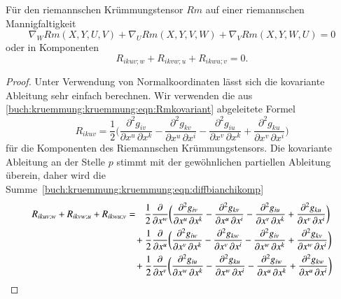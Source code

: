 \begin{satz}
Für den riemannschen Krümmungstensor $Rm$ auf einer riemannschen
Mannigfaltigkeit
\[
\nabla_W Rm(X,Y,U,V)
+
\nabla_U Rm(X,Y,V,W)
+
\nabla_V Rm(X,Y,W,U)
=
0
\]
oder in Komponenten
\begin{equation}
R_{ikuv;w}
+
R_{ikvw;u}
+
R_{ikwu;v}
=
0.
\label{buch:kruemmung:kruemmung:eqn:diffbianchikomp}
\end{equation}
\end{satz}

\begin{proof}
Unter Verwendung von Normalkoordinaten lässt sich die kovariante
Ableitung sehr einfach berechnen.
Wir verwenden die aus 
\ref{buch:kruemmung:kruemmung:eqn:Rmkovariant}
abgeleitete Formel
\[
R_{ikuv}
=
\frac12
\biggl(
\frac{\partial^2 g_{iv}}{\partial x^u\,\partial x^k}
-
\frac{\partial^2 g_{kv}}{\partial x^u\,\partial x^i}
-
\frac{\partial^2 g_{iu}}{\partial x^v\,\partial x^k}
+
\frac{\partial^2 g_{ku}}{\partial x^v\,\partial x^i}
\biggr)
\]
für die Komponenten des Riemannschen Krümmungstensors.
Die kovariante Ableitung an der Stelle $p$ stimmt mit der gewöhnlichen
partiellen Ableitung überein, daher wird die
Summe~\eqref{buch:kruemmung:kruemmung:eqn:diffbianchikomp}
\bgroup
{}
\begin{align}
R_{ikuv;w}
+
R_{ikvw;u}
+
R_{ikwu;v}
&=\phantom{+}
\frac12
\frac{\partial}{\partial x^w}
\biggl(
\frac{\partial^2 g_{iv}}{\partial x^u\,\partial x^k}
-
\frac{\partial^2 g_{kv}}{\partial x^u\,\partial x^i}
-
\frac{\partial^2 g_{iu}}{\partial x^v\,\partial x^k}
+
\frac{\partial^2 g_{ku}}{\partial x^v\,\partial x^i}
\biggr)
\notag
\\
&\phantom{=}\,+
\frac12
\frac{\partial}{\partial x^u}
\biggl(
\frac{\partial^2 g_{iw}}{\partial x^v\,\partial x^k}
-
\frac{\partial^2 g_{kw}}{\partial x^v\,\partial x^i}
-
\frac{\partial^2 g_{iv}}{\partial x^w\,\partial x^k}
+
\frac{\partial^2 g_{kv}}{\partial x^w\,\partial x^i}
\biggr)
\notag
\\
&\phantom{=}\,+
\frac12
\frac{\partial}{\partial x^v}
\biggl(
\frac{\partial^2 g_{iu}}{\partial x^w\,\partial x^k}
-
\frac{\partial^2 g_{ku}}{\partial x^w\,\partial x^i}
-
\frac{\partial^2 g_{iw}}{\partial x^u\,\partial x^k}
+
\frac{\partial^2 g_{kw}}{\partial x^u\,\partial x^i}
\biggr)

\end{align}
\end{proof}
